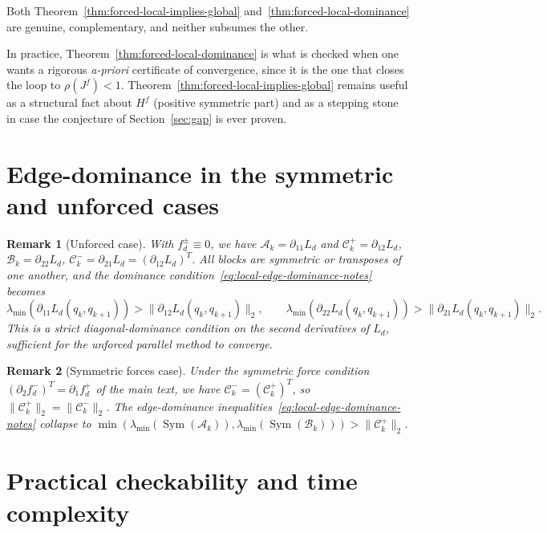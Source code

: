 \documentclass{article}
\newtheorem{remark}{Remark}
\newcommand{\Ld}{L_d}
\providecommand{\mdif}[1]{\partial_{#1}}
\renewcommand{\mdif}[1]{\partial_{#1}}
\newcommand{\Sym}{\operatorname{Sym}}
\begin{document}
Both Theorem~\ref{thm:forced-local-implies-global} and~\ref{thm:forced-local-dominance} are
genuine, complementary, and neither subsumes the other.

In practice, Theorem~\ref{thm:forced-local-dominance} is what is checked when
one wants a rigorous \emph{a-priori} certificate of convergence, since it is the
one that closes the loop to $\rho(J^f) < 1$. Theorem~\ref{thm:forced-local-implies-global}
remains useful as a structural fact about $H^f$ (positive symmetric part) and as
a stepping stone in case the conjecture of Section~\ref{sec:gap} is ever proven.

\section{Edge-dominance in the symmetric and unforced cases}\label{sec:recovers}

\begin{remark}[Unforced case]\label{rem:unforced-recovery}
    With $f_d^\pm \equiv 0$, we have $\mathcal{A}_k = \mdif{11} \Ld$ and
    $\mathcal{C}^+_k = \mdif{12} \Ld$, $\mathcal{B}_k = \mdif{22}\Ld$,
    $\mathcal{C}^-_k = \mdif{21}\Ld = (\mdif{12}\Ld)^T$. All blocks are
    symmetric or transposes of one another, and the dominance
    condition~\eqref{eq:local-edge-dominance-notes} becomes
    \[
        \lambda_{\min}(\mdif{11}\Ld(q_k, q_{k+1})) > \|\mdif{12}\Ld(q_k, q_{k+1})\|_2,
        \qquad
        \lambda_{\min}(\mdif{22}\Ld(q_k, q_{k+1})) > \|\mdif{21}\Ld(q_k, q_{k+1})\|_2.
    \]
    This is a strict diagonal-dominance condition on the second derivatives of
    $\Ld$, sufficient for the unforced parallel method to converge.
\end{remark}

\begin{remark}[Symmetric forces case]\label{rem:sym-recovery}
    Under the symmetric force condition $(\mdif{2} f_d^-)^T = \mdif{1} f_d^+$
    of the main text, we have $\mathcal{C}^-_k = (\mathcal{C}^+_k)^T$, so
    $\|\mathcal{C}^+_k\|_2 = \|\mathcal{C}^-_k\|_2$. The edge-dominance
    inequalities~\eqref{eq:local-edge-dominance-notes} collapse to
    $\min(\lambda_{\min}(\Sym(\mathcal{A}_k)), \lambda_{\min}(\Sym(\mathcal{B}_k))) > \|\mathcal{C}^+_k\|_2$.
\end{remark}

\section{Practical checkability and time complexity}\label{sec:practical}
\end{document}
